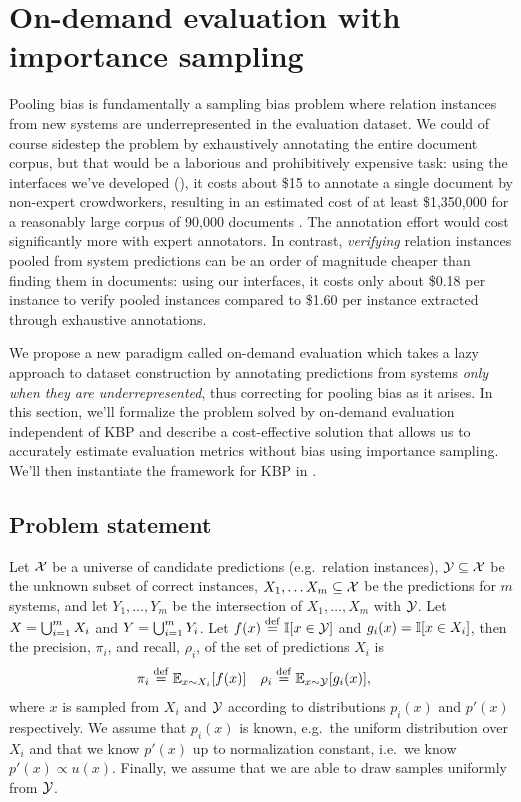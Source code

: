 \section{On-demand evaluation with importance sampling}
\label{sec:method}

Pooling bias is fundamentally a sampling bias problem where relation instances from new systems are underrepresented in the evaluation dataset.
We could of course sidestep the problem by exhaustively annotating the entire document corpus, but that would be a laborious and prohibitively expensive task:
using the interfaces we've developed (), it costs about \$15 to annotate a single document by non-expert crowdworkers, resulting in an estimated cost of at least \$1,350,000 for a reasonably large corpus of 90,000 documents \citep{}.
The annotation effort would cost significantly more with expert annotators.
In contrast, \textit{verifying} relation instances pooled from system predictions can be an order of magnitude cheaper than finding them in documents: using our interfaces, it costs only about \$0.18 per instance to verify pooled instances compared to \$1.60 per instance extracted through exhaustive annotations. 

We propose a new paradigm called on-demand evaluation which takes a lazy approach to dataset construction by annotating predictions from systems \textit{only when they are underrepresented}, thus correcting for pooling bias as it arises.
In this section, we'll formalize the problem solved by on-demand evaluation independent of KBP and describe a cost-effective solution that allows us to accurately estimate evaluation metrics without bias using importance sampling.
We'll then instantiate the framework for KBP in .

\subsection{Problem statement}
Let $\mathcal{X}$ be a universe of candidate predictions (e.g.\, relation instances),
  $\mathcal{Y} \subseteq \mathcal{X}$ be the unknown subset of correct instances,
  $X_1, \ldots X_m \subseteq \mathcal{X}$ be the predictions for $m$ systems,
  and let $Y_1, \ldots, Y_m$ be the intersection of $X_1, \ldots, X_m$ with $\mathcal{Y}$.
Let $X = \bigcup_{i=1}^m X_i$ and $Y = \bigcup_{i=1}^m Y_i$.
Let $f(x) \stackrel{\rm def}{=} \mathbb{I}[x \in \mathcal{Y}]$ and $g_i(x) = \mathbb{I}[x \in X_i]$, then the precision, $\pi_i$, and recall, $\rho_i$, of the set of predictions $X_i$ is
\begin{align*}
  \pi_i  &\stackrel{\rm def}{=} \mathbb{E}_{x \sim X_i}[f(x)] &
  \rho_i &\stackrel{\rm def}{=} \mathbb{E}_{x \sim \mathcal{Y}}[g_i(x)],
\end{align*}
where $x$ is sampled from $X_i$ and $\mathcal{Y}$ according to distributions $p_i(x)$ and $p'(x)$ respectively.
We assume that $p_i(x)$ is known, e.g.\, the uniform distribution over $X_i$
  and that we know $p'(x)$ up to normalization constant, i.e.\ we know $p'(x) \propto u(x)$.
Finally, we assume that we are able to draw samples uniformly from $\mathcal{Y}$.

